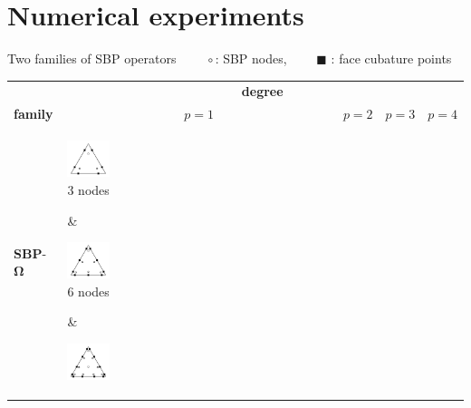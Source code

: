 \documentclass{beamer}
\begin{document}
\section{Numerical experiments}
\begin{frame}{Two families of SBP operators}
    $\qquad\circ$: SBP nodes,$\qquad$ \tiny $\blacksquare$ \normalsize: face cubature points \\
    \footnotesize
    \begin{tabular}{p{}p{}p{}p{}p{}}
        & \multicolumn{4}{c}{\textbf{degree}} \\\cline{2-5}
        \textbf{family} & 
        \multicolumn{1}{c}{$p=1$} & 
        \multicolumn{1}{c}{$p=2$} & 
        \multicolumn{1}{c}{$p=3$} & 
        \multicolumn{1}{c}{$p=4$}  \rule{0ex}{3ex} \\\hline
        \vspace*{-0.15\textwidth}\textbf{SBP}-$\bm{\Omega}$ &
        \parbox[b]{0.15\textwidth}{%
            \begin{center}%
                \includegraphics[width=0.16\textwidth]{figures/p1_Omega}\\
                 3 nodes
            \end{center}} &
        \parbox[b]{0.15\textwidth}{%
            \begin{center}%
                \includegraphics[width=0.16\textwidth]{figures/p2_Omega}\\
                6 nodes
            \end{center}} &
        \parbox[b]{0.15\textwidth}{%
            \begin{center}%
                \includegraphics[width=0.16\textwidth]{figures/p3_Omega}\\

\end{center}}
\end{tabular}
\end{frame}
\end{document}
